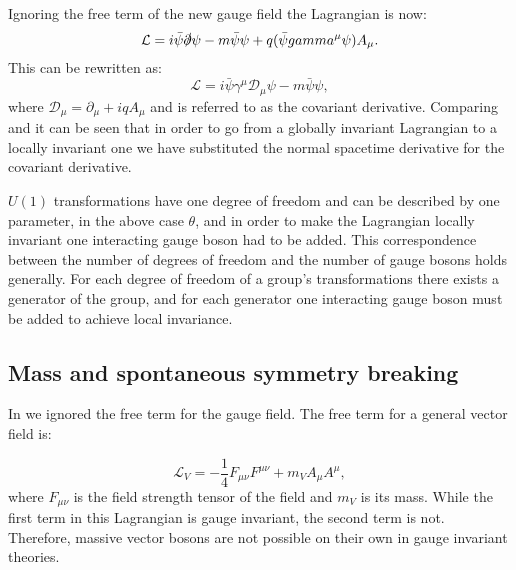 Ignoring the free term of the new gauge field the Lagrangian is now:
\begin{equation}
  \mathcal{L}=i\bar{\psi}\slashed{\partial}\psi-m\bar{\psi}\psi+q(\bar{\psi}\gamma^{\mu}\psi) A_{\mu}.
\end{equation}
This can be rewritten as:
\begin{equation}
  \label{eq:localdiraclagrangian}
  \mathcal{L}=i\bar{\psi}\gamma^{\mu}\mathcal{D}_{\mu}\psi-m\bar{\psi}\psi,
\end{equation}
where $\mathcal{D}_{\mu}=\partial_{\mu}+iqA_{\mu}$ and is referred to as the covariant derivative. Comparing  and  it can be seen that in order to go from a globally invariant Lagrangian to a locally invariant one we have substituted the normal spacetime derivative for the covariant derivative.

$U(1)$ transformations have one degree of freedom and can be described by one parameter, in the above case $\theta$, and in order to make the Lagrangian locally invariant one interacting gauge boson had to be added. This correspondence between the number of degrees of freedom and the number of gauge bosons holds generally. For each degree of freedom of a group's transformations there exists a generator of the group, and for each generator one interacting gauge boson must be added to achieve local invariance.


\subsection{Mass and spontaneous symmetry breaking}
In  we ignored the free term for the gauge field. The free term for a general vector field is:

\begin{equation}
  \label{eq:vectorlagrangian}
  \mathcal{L}_{V}=-\frac{1}{4}F_{\mu\nu}F^{\mu\nu}+m_{V}A_{\mu}A^{\mu},
\end{equation}
where $F_{\mu\nu}$ is the field strength tensor of the field and $m_{V}$ is its mass. While the first term in this Lagrangian is gauge invariant, the second term is not. Therefore, massive vector bosons are not possible on their own in gauge invariant theories.

